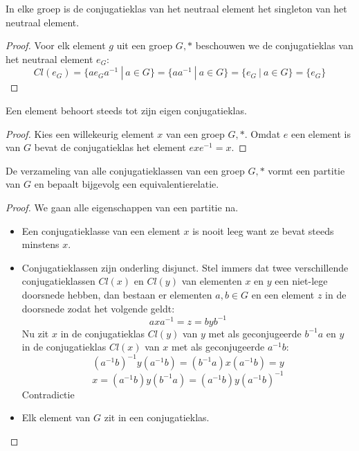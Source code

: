 \documentclass[main.tex]{subfiles}
\begin{document}
\begin{st}
  In elke groep is de conjugatieklas van het neutraal element het singleton van het neutraal element.

  \begin{proof}
    Voor elk element $g$ uit een groep $G,*$ beschouwen we de conjugatieklas van het neutraal element $e_{G}$:
    \[ Cl(e_{G}) = \{ ae_{G}a^{-1}\ |\ a \in G \} = \{ aa^{-1}\ |\ a \in G \} = \{ e_{G}\ |\ a \in G \} = \{ e_{G} \} \]
  \end{proof}
\end{st}

\begin{ei}
  \label{ei:element-eigen-conjugatieklas}
  Een element behoort steeds tot zijn eigen conjugatieklas.

  \begin{proof}
    Kies een willekeurig element $x$ van een groep $G,*$.
    Omdat $e$ een element is van $G$ bevat de conjugatieklas het element $exe^{-1} = x$.
  \end{proof}
\end{ei}

\begin{ei}
  \label{ei:conjugatieklassen-partitie}
  De verzameling van alle conjugatieklassen van een groep $G,*$ vormt een partitie van $G$ en bepaalt bijgevolg een equivalentierelatie.
  \begin{proof}
    We gaan alle eigenschappen van een partitie na.
    \begin{itemize}
    \item Een conjugatieklasse van een element $x$ is nooit leeg want ze bevat steeds minstens $x$.
    \item Conjugatieklassen zijn onderling disjunct.
      Stel immers dat twee verschillende conjugatieklassen $Cl(x)$ en $Cl(y)$ van elementen $x$ en $y$ een niet-lege doorsnede hebben, dan bestaan er elementen $a,b \in G$ en een element $z$ in de doorsnede zodat het volgende geldt:
      \[ axa^{-1} = z = byb^{-1} \]
      Nu zit $x$ in de conjugatieklas $Cl(y)$ van $y$ met als geconjugeerde $b^{-1}a$ en $y$ in de conjugatieklas $Cl(x)$ van $x$ met als geconjugeerde $a^{-1}b$:
      \[ (a^{-1}b)^{-1}y(a^{-1}b) = (b^{-1}a)x(a^{-1}b) = y \]
      \[ x = (a^{-1}b) y(b^{-1}a) = (a^{-1}b) y (a^{-1}b)^{-1} \]
      Contradictie
    \item Elk element van $G$ zit in een conjugatieklas.
    \end{itemize}
  \end{proof}
\end{ei}
\end{document}
